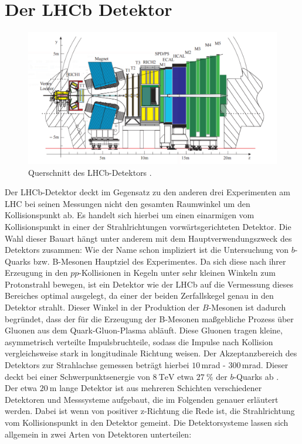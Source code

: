 \section{Der LHCb Detektor}
%
\begin{figure}[H]
  \centering
      \includegraphics[width=\textwidth]{Plots/lhcb.pdf}
  \caption{Querschnitt des LHCb-Detektors \cite{lhcb}.}
  \label{fig:lhcb}
\end{figure}
%
Der LHCb-Detektor deckt im Gegensatz zu den anderen drei Experimenten am LHC bei seinen Messungen nicht den gesamten Raumwinkel um den Kollisionspunkt ab. Es handelt sich hierbei um einen einarmigen vom Kollisionspunkt in einer der Strahlrichtungen vorwärtsgerichteten Detektor. Die Wahl dieser Bauart hängt unter anderem mit dem Hauptverwendungszweck des Detektors zusammen: Wie der Name schon impliziert ist die Untersuchung von $b$-Quarks bzw. B-Mesonen Hauptziel des Experimentes. Da sich diese nach ihrer Erzeugung in den $pp$-Kollisionen in Kegeln unter sehr kleinen Winkeln zum Protonstrahl bewegen, ist ein Detektor wie der LHCb auf die Vermessung dieses Bereiches optimal ausgelegt, da einer der beiden Zerfallskegel genau in den Detektor strahlt. Dieser Winkel in der Produktion der $B$-Mesonen ist dadurch begründet, dass der für die Erzeugung der B-Mesonen maßgebliche Prozess über Gluonen aus dem Quark-Gluon-Plasma abläuft. Diese Gluonen tragen kleine, asymmetrisch verteilte Impulsbruchteile, sodass die Impulse nach Kollision vergleichsweise stark in longitudinale Richtung weisen. Der Akzeptanzbereich des Detektors zur Strahlachse gemessen beträgt hierbei $10$\,mrad - $300$\,mrad. Dieser deckt bei einer Schwerpunktsenergie von $\SI{8}{\tera\electronvolt}$ etwa $\SI{27}{\percent}$ der $b$-Quarks ab \cite{rad}.\\
%
Der etwa $\SI{20}{\meter}$ lange Detektor ist aus mehreren Schichten verschiedener Detektoren und Messsysteme aufgebaut, die im Folgenden genauer erläutert werden. Dabei ist wenn von positiver z-Richtung die Rede ist, die Strahlrichtung vom Kollisionspunkt in den Detektor gemeint. Die Detektorsysteme lassen sich allgemein in zwei Arten von Detektoren unterteilen:
